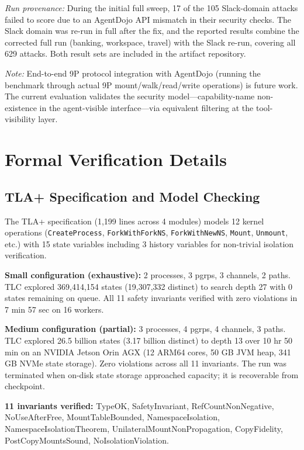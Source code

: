 \documentclass[acmsmall,screen,review]{acmart}
\begin{document}
\textit{Run provenance:} During the initial full sweep, 17 of the 105 Slack-domain
attacks failed to score due to an AgentDojo API mismatch in their security checks. The
Slack domain was re-run in full after the fix, and the reported results combine the
corrected full run (banking, workspace, travel) with the Slack re-run, covering all 629
attacks. Both result sets are included in the artifact repository.

\textit{Note:} End-to-end 9P protocol integration with AgentDojo (running the benchmark
through actual 9P mount/walk/read/write operations) is future work. The current evaluation
validates the security model---capability-name non-existence in the agent-visible
interface---via equivalent filtering at the tool-visibility layer.



\section{Formal Verification Details}
\subsection{TLA+ Specification and Model Checking}

The TLA+ specification (1,199 lines across 4 modules) models 12 kernel operations
(\texttt{CreateProcess}, \texttt{ForkWithForkNS}, \texttt{ForkWithNewNS}, \texttt{Mount},
\texttt{Unmount}, etc.) with 15 state variables including 3 history variables for
non-trivial isolation verification.

\textbf{Small configuration (exhaustive):} 2 processes, 3 pgrps, 3 channels, 2 paths.
TLC explored 369,414,154 states (19,307,332 distinct) to search depth 27 with 0 states
remaining on queue. All 11 safety invariants verified with zero violations in 7 min
57 sec on 16 workers.

\textbf{Medium configuration (partial):} 3 processes, 4 pgrps, 4 channels, 3 paths.
TLC explored 26.5 billion states (3.17 billion distinct) to depth 13 over 10 hr
50 min on an NVIDIA Jetson Orin AGX (12 ARM64 cores, 50 GB JVM heap, 341 GB NVMe state
storage). Zero violations across all 11 invariants. The run was terminated when
on-disk state storage approached capacity; it is recoverable from checkpoint.

\textbf{11 invariants verified:} TypeOK, SafetyInvariant, RefCountNonNegative,
NoUseAfterFree, MountTableBounded, NamespaceIsolation, NamespaceIsolationTheorem,
UnilateralMountNonPropagation, CopyFidelity, PostCopyMountsSound, NoIsolationViolation.
\end{document}
